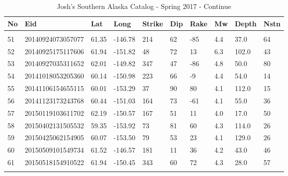 \documentclass[11pt,titlepage,fleqn]{article}
\begin{document}
\begin{table}[]
\centering
\caption{Josh's Southern Alaska Catalog - Spring 2017 - Continue}
\label{my-label}
\begin{tabular}{llllllllll}
\hline
No & Eid & Lat & Long & Strike & Dip & Rake & Mw & Depth & Nstn \\ \hline \\

51 & 20140924073057077 & 61.35 & -146.78 & 214 &  62 & -85 & 4.4 & 37.0 & 64 \\ 
52 & 20140925175117606 & 61.94 & -151.82 &  48 &  72 &  13 & 6.3 & 102.0 & 43 \\ 
53 & 20140927035311652 & 62.01 & -149.82 & 347 &  47 & -86 & 4.8 & 50.0 & 80 \\ 
54 & 20141018053205360 & 60.14 & -150.98 & 223 &  66 &  -9 & 4.4 & 54.0 & 14 \\ 
55 & 20141106154655115 & 60.01 & -153.29 &  37 &  90 &  80 & 4.1 & 112.0 & 15 \\ 
56 & 20141123173243768 & 60.44 & -151.03 & 164 &  73 & -61 & 4.1 & 55.0 & 36 \\ 
57 & 20150119103611702 & 62.19 & -150.57 & 167 &  51 &  11 & 4.0 & 17.0 & 50 \\ 
58 & 20150402131505532 & 59.35 & -153.92 &  73 &  81 &  60 & 4.3 & 114.0 & 26 \\ 
59 & 20150425062154905 & 60.07 & -153.50 &  79 &  53 &  23 & 4.1 & 129.0 & 26 \\ 
60 & 20150509101549734 & 61.52 & -146.57 & 181 &  11 &  36 & 4.2 & 43.0 & 46 \\ 
61 & 20150518154910522 & 61.94 & -150.45 & 343 &  60 &  72 & 4.3 & 28.0 & 57 \\
&  &  &  &  &  &  &  &  &  \\ \hline
\end{tabular}
\end{table}




\end{document}
